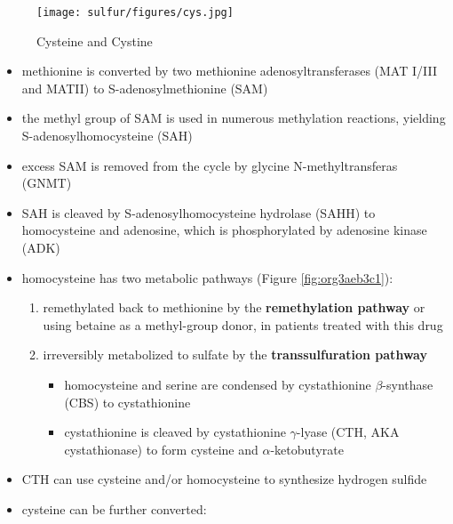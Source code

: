 \documentclass[12pt]{scrartcl}
\begin{document}
\begin{center}
\begin{center}
\begin{center}
\chemnameinit{}
\chemnameinit{}
\hspace{20}
\chemnameinit{}
\hspace{20}
\end{center}


\begin{figure}[htbp]
\centering
\texttt{[image: sulfur/figures/cys.jpg]}
\caption{\label{fig:org98d1db6}Cysteine and Cystine}
\end{figure}

\begin{itemize}
\item methionine is converted by two methionine adenosyltransferases (MAT
I/III and MATII) to S-adenosylmethionine (SAM)
\item the methyl group of SAM is used in numerous methylation reactions,
yielding S-adenosylhomocysteine (SAH)
\item excess SAM is removed from the cycle by glycine N-methyltransferas (GNMT)
\item SAH is cleaved by S-adenosylhomocysteine hydrolase (SAHH) to
homocysteine and adenosine, which is phosphorylated by adenosine
kinase (ADK)
\item homocysteine has two metabolic pathways (Figure \ref{fig:org3aeb3c1}):
\begin{enumerate}
\item remethylated back to methionine by the \textbf{remethylation pathway} or
using betaine as a methyl-group donor, in patients treated with
this drug
\item irreversibly metabolized to sulfate
by the \textbf{transsulfuration pathway}
\begin{itemize}
\item homocysteine and serine are condensed by cystathionine
\(\beta\)-synthase (CBS) to cystathionine
\item cystathionine is cleaved by cystathionine \(\gamma\)-lyase (CTH, AKA cystathionase) to
form cysteine and \(\alpha\)-ketobutyrate
\end{itemize}
\end{enumerate}
\item CTH can use cysteine and/or homocysteine to synthesize hydrogen
sulfide
\item cysteine can be further converted:

\end{itemize}
\end{center}
\end{center}
\end{document}
